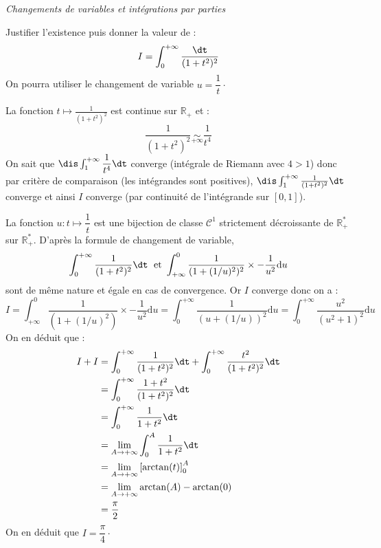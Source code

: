 \documentclass[a4paper,10pt]{report}
\begin{document}
\begin{center}
\textit{{ {\large Changements de variables et intégrations par parties}}}
\end{center}

\medskip


\begin{Exa} Justifier l'existence puis donner la valeur de :
  \[
  I = \int_{0}^{ + \infty} \frac{\dt}{(1 + t^{2})^{2}}
  \]
On pourra utiliser le changement de variable $u = \dfrac{1}{t} \cdot$
\end{Exa}

\corr La fonction $t \mapsto \frac{1}{(1 + t^{2})^{2}}$ est continue sur $\mathbb{R}_+$ et :
$$ \frac{1}{(1 + t^{2})^{2}} \underset{+ \infty}{\sim} \dfrac{1}{t^4}$$
On sait que $\dis \int_1^{+ \infty} \dfrac{1}{t^4} \dt$ converge (intégrale de Riemann avec $4>1$) donc par critère de comparaison (les intégrandes sont positives), $\dis  \int_1^{+ \infty}  \frac{1}{(1 + t^{2})^{2}} \dt$ converge et ainsi $I$ converge (par continuité de l'intégrande sur $[0,1]$).

\medskip

\noindent La fonction $u : t \mapsto \dfrac{1}{t}$ est une bijection de classe $\mathcal{C}^1$ strictement décroissante de $\mathbb{R}_+^*$ sur $\mathbb{R}_+^*$. D'après la formule de changement de variable,
$$ \int_0^{+ \infty}  \frac{1}{(1 + t^{2})^{2}} \dt \; \hbox{ et } \int_{+ \infty}^0 \dfrac{1}{(1+(1/u)^2)^2} \times -\dfrac{1}{u^2} \textrm{d}u$$
sont de même nature et égale en cas de convergence. Or $I$ converge donc on a :
$$ I = \int_{+ \infty}^0 \dfrac{1}{(1+(1/u)^2)} \times -\dfrac{1}{u^2} \textrm{d}u = \int_{0}^{+ \infty} \dfrac{1}{(u+(1/u))^2}  \textrm{d}u    =    \int_{0}^{+ \infty} \dfrac{u^2}{(u^2+1)^2}  \textrm{d}u $$
On en déduit que :
\begin{align*}
I+I & = \int_0^{+ \infty}  \frac{1}{(1 + t^{2})^{2}} \dt + \int_0^{+ \infty}  \frac{t^2}{(1 + t^{2})^{2}} \dt\\
& = \int_0^{+ \infty}  \frac{1+t^2}{(1 + t^{2})^{2}} \dt \\
& = \int_0^{+ \infty}  \frac{1}{1 + t^{2}} \dt \\
& = \lim_{A \rightarrow + \infty} \int_0^{A}  \frac{1}{1 + t^{2}} \dt \\
& = \lim_{A \rightarrow + \infty} \left[ \arctan(t) \right]_0^A \\
& = \lim_{A \rightarrow + \infty} \arctan(A)- \arctan(0) \\
& = \dfrac{\pi}{2}
\end{align*}
On en déduit que $I = \dfrac{\pi}{4} \cdot$
\end{document}
